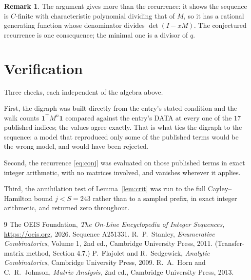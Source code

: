 \documentclass[11pt,a4paper]{article}
\theoremstyle{plain}
\theoremstyle{definition}
\newtheorem{remark}[theorem]{Remark}
\begin{document}
\begin{remark}
The argument gives more than the recurrence: it shows the sequence is $C$-finite with
characteristic polynomial dividing that of $M$, so it has a rational generating function
whose denominator divides $\det(I-xM)$. The conjectured recurrence is one consequence; the
minimal one is a divisor of $q$.
\end{remark}

\section{Verification}

Three checks, each independent of the algebra above.

First, the digraph was built directly from the entry's stated condition and the walk counts
$\mathbf{1}^{\!\top}M^{n}\mathbf{1}$ compared against the entry's DATA at every one of
the $17$ published indices; the values agree exactly. That is what ties the digraph to
the sequence: a model that reproduced only some of the published terms would be the wrong
model, and would have been rejected.

Second, the recurrence \eqref{eq:conj} was evaluated on those published terms in exact
integer arithmetic, with no matrices involved, and vanishes wherever it applies.

Third, the annihilation test of Lemma~\ref{lem:crit} was run to the full Cayley--Hamilton
bound $j<S=243$ rather than to a sampled prefix, in exact integer arithmetic, and returned
zero throughout.

\begin{thebibliography}{9}
 The OEIS Foundation, \emph{The On-Line Encyclopedia of Integer
Sequences}, \url{https://oeis.org}, 2026. Sequence A251331.
 R.~P.~Stanley, \emph{Enumerative Combinatorics}, Volume 1, 2nd ed.,
Cambridge University Press, 2011. (Transfer-matrix method, Section 4.7.)
 P.~Flajolet and R.~Sedgewick, \emph{Analytic Combinatorics}, Cambridge
University Press, 2009.
 R.~A.~Horn and C.~R.~Johnson, \emph{Matrix Analysis}, 2nd ed., Cambridge
University Press, 2013.
\end{thebibliography}
\end{document}
